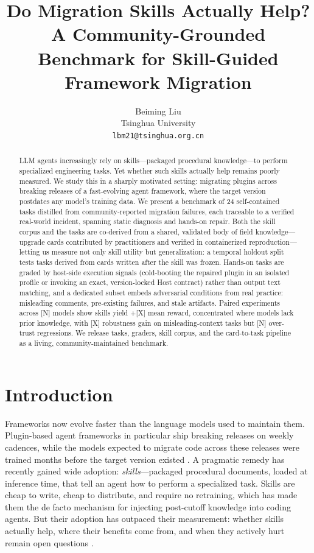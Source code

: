 \documentclass[11pt]{article}
\title{Do Migration Skills Actually Help? A Community-Grounded Benchmark for Skill-Guided Framework Migration}
\author{Beiming Liu \\
  Tsinghua University \\
  \texttt{lbm21@tsinghua.org.cn} \\}
\begin{document}
\maketitle
\begin{abstract}
LLM agents increasingly rely on skills---packaged procedural knowledge---to perform specialized engineering tasks.
Yet whether such skills actually help remains poorly measured.
We study this in a sharply motivated setting: migrating plugins across breaking releases of a fast-evolving agent framework, where the target version postdates any model's training data.
We present a benchmark of 24 self-contained tasks distilled from community-reported migration failures, each traceable to a verified real-world incident, spanning static diagnosis and hands-on repair.
Both the skill corpus and the tasks are co-derived from a shared, validated body of field knowledge---upgrade cards contributed by practitioners and verified in containerized reproduction---letting us measure not only skill utility but generalization: a temporal holdout split tests tasks derived from cards written after the skill was frozen.
Hands-on tasks are graded by host-side execution signals (cold-booting the repaired plugin in an isolated profile or invoking an exact, version-locked Host contract) rather than output text matching, and a dedicated subset embeds adversarial conditions from real practice: misleading comments, pre-existing failures, and stale artifacts.
Paired experiments across [N] models show skills yield +[X] mean reward, concentrated where models lack prior knowledge, with [X] robustness gain on misleading-context tasks but [N] over-trust regressions.
We release tasks, graders, skill corpus, and the card-to-task pipeline as a living, community-maintained benchmark.
\end{abstract}

\section{Introduction}

Frameworks now evolve faster than the language models used to maintain them.
Plugin-based agent frameworks in particular ship breaking releases on weekly cadences, while the models expected to migrate code across these releases were trained months before the target version existed \citep{llmlag}.
A pragmatic remedy has recently gained wide adoption: \emph{skills}---packaged procedural documents, loaded at inference time, that tell an agent how to perform a specialized task.
Skills are cheap to write, cheap to distribute, and require no retraining, which has made them the de facto mechanism for injecting post-cutoff knowledge into coding agents.
But their adoption has outpaced their measurement: whether skills actually help, where their benefits come from, and when they actively hurt remain open questions \citep{skillsbench,skilluse,skillsharmful}.
\end{document}
